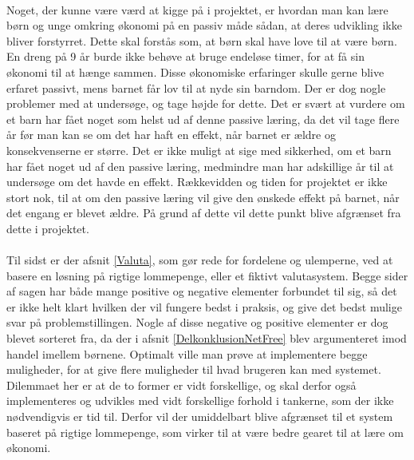 \\
Noget, der kunne være værd at kigge på i projektet, er hvordan man kan lære børn og unge omkring økonomi på en passiv måde sådan, at deres udvikling ikke bliver forstyrret. Dette skal forstås som, at børn skal have love til at være børn. En dreng på 9 år burde ikke behøve at bruge endeløse timer, for at få sin økonomi til at hænge sammen. Disse økonomiske erfaringer skulle gerne blive erfaret passivt, mens barnet får lov til at nyde sin barndom. Der er dog nogle problemer med at undersøge, og tage højde for dette. Det er svært at vurdere om et barn har fået noget som helst ud af denne passive læring, da det vil tage flere år før man kan se om det har haft en effekt, når barnet er ældre og konsekvenserne er større. Det er ikke muligt at sige med sikkerhed, om et barn har fået noget ud af den passive læring, medmindre man har adskillige år til at undersøge om det havde en effekt. Rækkevidden og tiden for projektet er ikke stort nok, til at om den passive læring vil give den ønskede effekt på barnet, når det engang er blevet ældre. På grund af dette vil dette punkt blive afgrænset fra dette i projektet.\\
\\
Til sidst er der afsnit \ref{Valuta}, som gør rede for fordelene og ulemperne, ved at basere en løsning på rigtige lommepenge, eller et fiktivt valutasystem. Begge sider af sagen har både mange positive og negative elementer forbundet til sig, så det er ikke helt klart hvilken der vil fungere bedst i praksis, og give det bedst mulige svar på problemstillingen. Nogle af disse negative og positive elementer er dog blevet sorteret fra, da der i afsnit \ref{DelkonklusionNetFree} blev argumenteret imod handel imellem børnene. Optimalt ville man prøve at implementere begge muligheder, for at give flere muligheder til hvad brugeren kan med systemet. Dilemmaet her er at de to former er vidt forskellige, og skal derfor også implementeres og udvikles med vidt forskellige forhold i tankerne, som der ikke nødvendigvis er tid til. Derfor vil der umiddelbart blive afgrænset til et system baseret på rigtige lommepenge, som virker til at være bedre gearet til at lære om økonomi.

